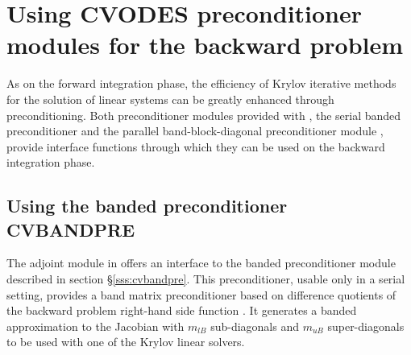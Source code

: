 \section{Using CVODES preconditioner modules for the backward problem}

As on the forward integration phase, the efficiency of Krylov iterative methods
for the solution of linear systems can be greatly enhanced through preconditioning.
Both preconditioner modules provided with {\sundials}, the serial banded
preconditioner {\cvbandpre} and the parallel band-block-diagonal preconditioner
module {\cvbbdpre}, provide interface functions through which they can be used
on the backward integration phase.


\subsection{Using the banded preconditioner CVBANDPRE}

The adjoint module in {\cvodes} offers an interface to the banded
preconditioner module {\cvbandpre} described in section \S\ref{sss:cvbandpre}.
This preconditioner, usable only in a serial setting, provides a band matrix
preconditioner based on difference quotients of the backward problem right-hand
side function .  It generates
a banded approximation to the Jacobian with $m_{lB}$ sub-diagonals and $m_{uB}$
super-diagonals to be used with one of the Krylov linear solvers.

